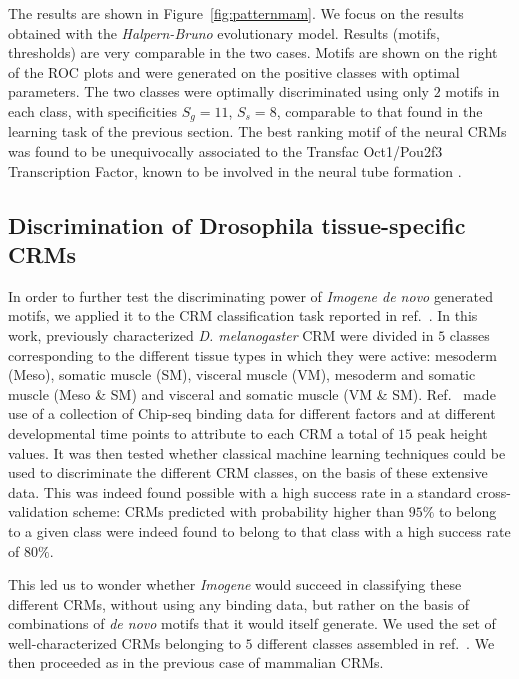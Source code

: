 \documentclass[a4,center,fleqn]{NAR}
\begin{document}
The results are shown in Figure~\ref{fig:patternmam}.
We focus on the results obtained with  the {\em Halpern-Bruno} evolutionary
model.
Results (motifs, thresholds) are %
very comparable in the two cases.
Motifs are shown on the right of the ROC plots and were generated on the
positive classes with optimal parameters.
%
The two classes were optimally discriminated using only $2$ motifs in each
class, with specificities $S_g=11$, $S_s=8$, comparable to that found in the
learning task of the previous section.
The best ranking motif of the neural CRMs was found to be unequivocally
associated to the Transfac Oct1/Pou2f3 Transcription Factor, known to be
involved in the neural tube formation \cite{Kiyota:2008fk}.

\subsection*{Discrimination of Drosophila tissue-specific CRMs}

In order to further test  the discriminating power of {\em Imogene de novo}
generated motifs, we applied it to the CRM classification task reported in
ref.~\cite{pmid19890324}.
In this work, previously characterized {\em D. melanogaster} CRM were divided
in $5$ classes corresponding to  the different tissue types in which they were
active: mesoderm (Meso), somatic muscle (SM), visceral muscle (VM), mesoderm
and somatic muscle (Meso \& SM) and visceral and somatic muscle (VM \& SM).
Ref.~\cite{pmid19890324} made use of a collection of  Chip-seq binding data for
different factors and at different developmental time points to attribute to
each CRM a total of $15$ peak height values.
It was then tested whether classical machine learning techniques could be used
to discriminate  the different CRM classes, on the basis of these extensive
data.
This was indeed found possible with a high success rate  in a standard
cross-validation scheme: CRMs predicted with probability higher than $95\%$ to
belong to a given class were indeed found to belong to that class with a high
success rate  of $80\%$.

This led us to wonder whether {\em Imogene} would succeed in classifying these
different CRMs,  without using any binding data, but rather on the basis of
combinations of {\it de novo}  motifs that it would itself generate. 
We used the  set of well-characterized  CRMs belonging to $5$ different classes
assembled in  ref.~\cite{pmid19890324}.
We then proceeded as in the previous case of mammalian CRMs.
    
\end{document}
